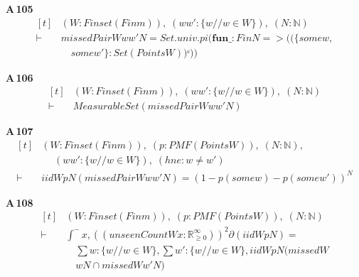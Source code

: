 \noindent\textbf{A\,105}\quad{}
{\footnotesize\[ \begin{aligned}[t]
&(\mathit{W} : \mathit{Finset} (\mathit{Fin} \mathit{m})),\; (\mathit{w} \mathit{w'} : \{ \mathit{w} // \mathit{w} \in \mathit{W}\} ),\; (\mathit{N} : \mathbb{N} )\\
\vdash\;&\mathit{missedPair} \mathit{W} \mathit{w} \mathit{w'} \mathit{N} = \mathit{Set}.\mathit{univ}.\mathit{pi} (\mathbf{fun} \mathit{\_} : \mathit{Fin} \mathit{N} => ((\{ \mathit{some} \mathit{w},\\
&\quad \mathit{some} \mathit{w'}\} : \mathit{Set} (\mathit{Points} \mathit{W}))ᶜ))
\end{aligned} \]}

\noindent\textbf{A\,106}\quad{}
{\footnotesize\[ \begin{aligned}[t]
&(\mathit{W} : \mathit{Finset} (\mathit{Fin} \mathit{m})),\; (\mathit{w} \mathit{w'} : \{ \mathit{w} // \mathit{w} \in \mathit{W}\} ),\; (\mathit{N} : \mathbb{N} )\\
\vdash\;&\mathit{MeasurableSet} (\mathit{missedPair} \mathit{W} \mathit{w} \mathit{w'} \mathit{N})
\end{aligned} \]}

\noindent\textbf{A\,107}\quad{}
{\footnotesize\[ \begin{aligned}[t]
&(\mathit{W} : \mathit{Finset} (\mathit{Fin} \mathit{m})),\; (\mathit{p} : \mathit{PMF} (\mathit{Points} \mathit{W})),\; (\mathit{N} : \mathbb{N} ),\\
&\quad \; (\mathit{w} \mathit{w'} : \{ \mathit{w} // \mathit{w} \in \mathit{W}\} ),\; (\mathit{hne} : \mathit{w} \neq \mathit{w'})\\
\vdash\;&\mathit{iid} \mathit{W} \mathit{p} \mathit{N} (\mathit{missedPair} \mathit{W} \mathit{w} \mathit{w'} \mathit{N}) = (1 - \mathit{p} (\mathit{some} \mathit{w}) - \mathit{p} (\mathit{some} \mathit{w'}))^{\mathit{N}}
\end{aligned} \]}

\noindent\textbf{A\,108}\quad{}
{\footnotesize\[ \begin{aligned}[t]
&(\mathit{W} : \mathit{Finset} (\mathit{Fin} \mathit{m})),\; (\mathit{p} : \mathit{PMF} (\mathit{Points} \mathit{W})),\; (\mathit{N} : \mathbb{N} )\\
\vdash\;&\int^{-} \mathit{x}, ((\mathit{unseenCount} \mathit{W} \mathit{x} : \mathbb{R}_{\geq0}^{\infty} ))^{2} ∂(\mathit{iid} \mathit{W} \mathit{p} \mathit{N}) =\\
&\quad \textstyle\sum \mathit{w} : \{ \mathit{w} // \mathit{w} \in \mathit{W}\} , \textstyle\sum \mathit{w'} : \{ \mathit{w} // \mathit{w} \in \mathit{W}\} , \mathit{iid} \mathit{W} \mathit{p} \mathit{N} (\mathit{missed} \mathit{W}\\
&\quad \mathit{w} \mathit{N} \cap \mathit{missed} \mathit{W} \mathit{w'} \mathit{N})
\end{aligned} \]}

